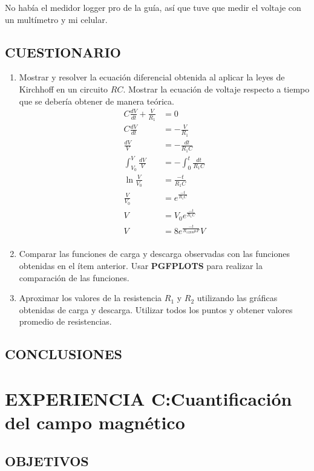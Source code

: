 \documentclass[10pt, twoside]{article}
\begin{document}
No había el medidor logger pro de la guía,
así que tuve que medir el voltaje con un multímetro y mi celular.

\subsection{CUESTIONARIO}%
\begin{enumerate}[label=\roman*]
	\item Mostrar y resolver la ecuación diferencial obtenida al aplicar la
		leyes de Kirchhoff en un circuito $RC$.
		Mostrar la ecuación de voltaje respecto a tiempo que se debería
		obtener de manera teórica.
		\begin{align*}
			C \frac{dV}{dt} + \frac{V}{R_1} &= 0 \\
			C \frac{dV}{dt} &= -\frac{V}{R_1}\\
			\frac{dV}{V} &= -\frac{dt}{R_1C}\\
			\int^V_{V_0}\frac{dV}{V} &= -\int^t_0\frac{dt}{R_1C}\\
			\ln{ \frac{V}{V_0} } &= \frac{-t}{R_1C} \\
			\frac{V}{V_0} &= e^{\frac{-t}{R_1C}} \\
			V &= V_0e^{\frac{-t}{R_1C}} \\
			V &= 8e^{\frac{-t}{R_12200\mu F}}V \\
		\end{align*}
	\item Comparar las funciones de carga y descarga observadas con las
		funciones obtenidas en el ítem anterior.
		Usar \textbf{PGFPLOTS} para realizar la comparación de las funciones.
	\item Aproximar los valores de la resistencia $R_1$ y $R_2$ utilizando
		las gráficas obtenidas de carga y descarga.
		Utilizar todos los puntos y obtener valores promedio de resistencias.
\end{enumerate}

\subsection{CONCLUSIONES}%

\newpage
\section{EXPERIENCIA C:Cuantificación del campo magnético}%

\subsection{OBJETIVOS}%
\end{document}
